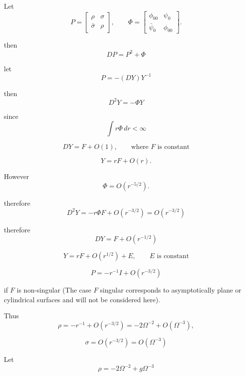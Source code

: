 Let
\[
P =
\begin{bmatrix}
\rho & \sigma\\
\bar{\sigma} & \rho
\end{bmatrix},
\qquad
\Phi =
\begin{bmatrix}
\phi_{00} & \psi_0\\
\bar{\psi}_0 & \phi_{00}
\end{bmatrix}.
\]


then
\begin{equation}
D P = P^2 + \Phi
\tag{6.1}
\end{equation}

let
\begin{equation}
P = -(D Y)Y^{-1}
\tag{6.2}
\end{equation}

then
\begin{equation}
D^2 Y = -\Phi Y
\tag{6.3}
\end{equation}

since
\[
\int r\Phi\,dr < \infty
\]

\[
DY = F + O(1),
\qquad
\text{where $F$ is constant}
\tag{6.4}
\]

\[
Y = rF + O(r).
\]

However
\[
\Phi = O(r^{-5/2}).
\]

therefore
\begin{equation}
D^2Y
=
-r\Phi F + O(r^{-3/2})
=
O(r^{-3/2})
\tag{6.5}
\end{equation}

therefore
\[
DY = F + O(r^{-1/2})
\]

\[
Y = rF + O(r^{1/2}) + E,
\qquad
\text{$E$ is constant}
\]

\begin{equation}
P
=
-r^{-1}I + O(r^{-3/2})
\tag{6.6}
\end{equation}

if $F$ is non-singular (The case $F$ singular corresponds to
asymptotically plane or cylindrical surfaces and will not be
considered here).

Thus
\[
\rho
=
-r^{-1} + O(r^{-3/2})
=
-2\Omega^{-2} + O(\Omega^{-3}),
\]

\begin{equation}
\sigma
=
O(r^{-3/2})
=
O(\Omega^{-3})
\tag{6.7}
\end{equation}

Let
\begin{equation}
\rho
=
-2\Omega^{-2} + g\Omega^{-3}
\tag{6.8}
\end{equation}

